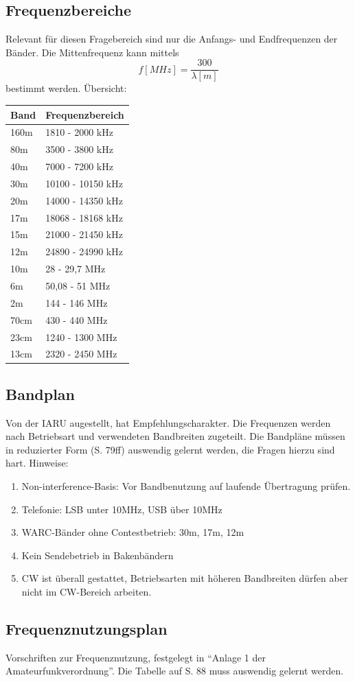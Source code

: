 \documentclass[11pt,BCOR=8.5mm]{scrartcl}
\begin{document}
\subsection{Frequenzbereiche}\label{sub:frequenzbereiche}
Relevant für diesen Fragebereich sind nur die Anfangs- und Endfrequenzen
der Bänder. Die Mittenfrequenz kann mittels
\begin{equation}
  f[MHz] = \frac{300}{\lambda[m]}
\end{equation}
bestimmt werden. Übersicht:

\begin{tabular}{|l|l|}
        \hline
        Band & Frequenzbereich \\
        \hline
        160m & 1810 - 2000 kHz\\
        80m & 3500 - 3800 kHz \\
        40m & 7000 - 7200 kHz \\
        30m & 10100 - 10150 kHz \\
        20m & 14000 - 14350 kHz \\
        17m & 18068 - 18168 kHz \\
        15m & 21000 - 21450 kHz \\
        12m & 24890 - 24990 kHz \\
        10m & 28 - 29,7 MHz \\
        6m & 50,08 - 51 MHz \\
        2m & 144 - 146 MHz \\
        70cm & 430 - 440 MHz \\
        23cm & 1240 - 1300 MHz \\
        13cm & 2320 - 2450 MHz \\
        \hline
\end{tabular}

\subsection{Bandplan}
Von der IARU augestellt, hat Empfehlungscharakter. Die Frequenzen werden
nach Betriebsart und verwendeten Bandbreiten zugeteilt. Die Bandpläne
müssen in reduzierter Form (S. 79ff) auswendig gelernt werden, die
Fragen hierzu sind hart. Hinweise:
\begin{enumerate}
  \item Non-interference-Basis: Vor Bandbenutzung auf laufende
    Übertragung prüfen.
  \item Telefonie: LSB unter 10MHz, USB über 10MHz
  \item WARC-Bänder ohne Contestbetrieb: 30m, 17m, 12m
  \item Kein Sendebetrieb in Bakenbändern
  \item CW ist überall gestattet, Betriebsarten mit höheren Bandbreiten
    dürfen aber nicht im CW-Bereich arbeiten.
\end{enumerate}

\subsection{Frequenznutzungsplan}\label{sub:frequenznutzungsplan}
Vorschriften zur Frequenznutzung, festgelegt in "`Anlage 1 der
Amateurfunkverordnung"'. Die Tabelle auf S. 88 muss auswendig gelernt
werden.
\end{document}
